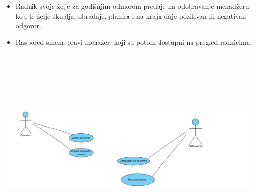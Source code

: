\documentclass{article}
\begin{document}
\begin{itemize}
\item Radnik svoje želje za godišnjim odmorom predaje na odobravanje menadžeru koji te želje skuplja, obrađuje, planira i na kraju daje pozitivan ili negativan odgovor.
\item Raspored smena pravi menažer, koji su potom dostupni na pregled radnicima.
\end{itemize}
\includegraphics[width=\textwidth, height=100mm, keepaspectratio]{SU_4_hr.png}
\end{document}
